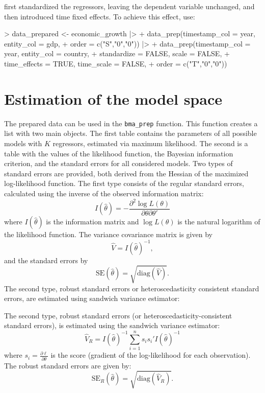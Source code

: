 \documentclass[a4paper]{article}
\begin{document}
\citet{Moral+2016} first standardized the regressors, leaving the dependent variable unchanged, and then introduced time fixed effects.
To achieve this effect, use:

\begin{Schunk}
\begin{Sinput}
> data_prepared <- economic_growth |>
+     data_prep(timestamp_col = year, entity_col = gdp,
+               order = c("S","0","0")) |>
+     data_prep(timestamp_col = year, entity_col = country,
+               standardize = FALSE, scale = FALSE,
+               time_effects = TRUE, time_scale = FALSE,
+               order = c("T","0","0"))
\end{Sinput}
\end{Schunk}

\section{Estimation of the model space}\label{model_space}
The prepared data can be used in the \verb+bma_prep+ function.
This function creates a list with two main objects.
The first table contains the parameters of all possible models with $K$ regressors, estimated via maximum likelihood.
The second is a table with the values of the likelihood function, the Bayesian information criterion, and the standard errors for all considered models.
Two types of standard errors are provided, both derived from the Hessian of the maximized log-likelihood function.
The first type consists of the regular standard errors, calculated using the inverse of the observed information matrix:
\begin{equation}
I(\hat{\theta}) = -\frac{\partial^2 \log L(\theta)}{\partial \theta \partial \theta'}
\end{equation}
where $I(\hat{\theta})$ is the information matrix and $\log L(\theta)$ is the natural logarithm of the likelihood function.
The variance covariance matrix is given by
\begin{equation}
\hat{V} = I(\hat{\theta})^{-1},
\end{equation}
and the standard errors by
\begin{equation}
\text{SE}(\hat{\theta}) = \sqrt{\text{diag}(\hat{V})}.
\end{equation}
The second type, robust standard errors or heteroscedasticity consistent standard errors, are estimated using sandwich variance estimator:

The second type, robust standard errors (or heteroscedasticity-consistent standard errors), is estimated using the sandwich variance estimator:
\begin{equation}
\hat{V}_{R} = I(\hat{\theta})^{-1} \sum_{i=1}^{n} s_i s_i' I(\hat{\theta})^{-1}
\end{equation}
where $s_i = \frac{\partial \ell}{\partial \theta}$ is the score (gradient of the log-likelihood for each observation).
The robust standard errors are given by:
\begin{equation}
\text{SE}_{R}(\hat{\theta}) = \sqrt{\text{diag}(\hat{V}_{R})}.
\end{equation}
\end{document}
